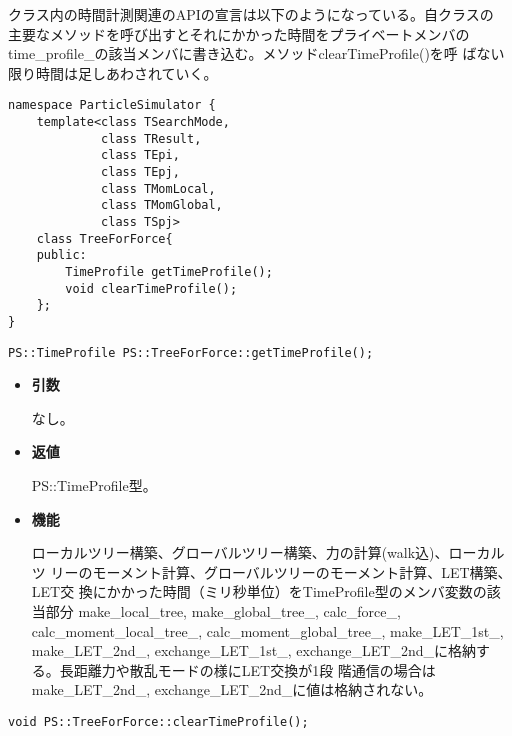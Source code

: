 クラス内の時間計測関連のAPIの宣言は以下のようになっている。自クラスの
主要なメソッドを呼び出すとそれにかかった時間をプライベートメンバの
time\_profile\_の該当メンバに書き込む。メソッドclearTimeProfile()を呼
ばない限り時間は足しあわされていく。

\begin{lstlisting}[caption=TreeForForce2]
namespace ParticleSimulator {
    template<class TSearchMode,
             class TResult,
             class TEpi,
             class TEpj,
             class TMomLocal,
             class TMomGlobal,
             class TSpj>
    class TreeForForce{
    public:
        TimeProfile getTimeProfile();
        void clearTimeProfile();
    };
}
\end{lstlisting}

\begin{screen}
\begin{verbatim}
PS::TimeProfile PS::TreeForForce::getTimeProfile();
\end{verbatim}
\end{screen}

\begin{itemize}

\item {\bf 引数}

なし。

\item {\bf 返値}

PS::TimeProfile型。

\item {\bf 機能}

ローカルツリー構築、グローバルツリー構築、力の計算(walk込)、ローカルツ
リーのモーメント計算、グローバルツリーのモーメント計算、LET構築、LET交
換にかかった時間（ミリ秒単位）をTimeProfile型のメンバ変数の該当部分
make\_local\_tree, make\_global\_tree\_, calc\_force\_,
calc\_moment\_local\_tree\_, calc\_moment\_global\_tree\_,
make\_LET\_1st\_, make\_LET\_2nd\_, exchange\_LET\_1st\_,
exchange\_LET\_2nd\_に格納する。長距離力や散乱モードの様にLET交換が1段
階通信の場合はmake\_LET\_2nd\_, exchange\_LET\_2nd\_に値は格納されない。

\end{itemize}

\begin{screen}
\begin{verbatim}
void PS::TreeForForce::clearTimeProfile();
\end{verbatim}
\end{screen}

